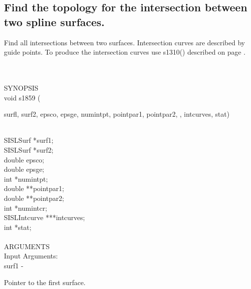 \subsection{Find the topology for the intersection between two spline surfaces.}
\begin{minipg1}
  Find all intersections between two surfaces.
  Intersection curves are described by guide points.
  To produce the intersection curves use s1310() described on page \pageref{s1310}.
\end{minipg1} \\ \\
SYNOPSIS\\
        \>void s1859    (\begin{minipg3}
                {\fov surfl}, {\fov surf2}, {\fov epsco}, {\fov epsge}, {\fov numintpt},
                {\fov pointpar1}, {\fov pointpar2}, , {\fov intcurves},
                {\fov stat})
                \end{minipg3}\\[0.3ex]
                \>\>    SISLSurf        \>      *{\fov surf1};\\
                \>\>    SISLSurf        \>      *{\fov surf2};\\
                \>\>    double  \>      {\fov epsco};\\
                \>\>    double  \>      {\fov epsge};\\
                \>\>    int     \>      *{\fov numintpt};\\
                \>\>    double  \>      **{\fov pointpar1};\\
                \>\>    double  \>      **{\fov pointpar2};\\
                \>\>    int     \>      *{\fov numintcr};\\
                \>\>    SISLIntcurve\>  ***{\fov intcurves};\\
                \>\>    int     \>      *{\fov stat};\\
\\
ARGUMENTS\\
        \>Input Arguments:\\
        \>\>    {\fov surf1}\> - \>     \begin{minipg2}
                                Pointer to the first surface.
                                \end{minipg2}\\
